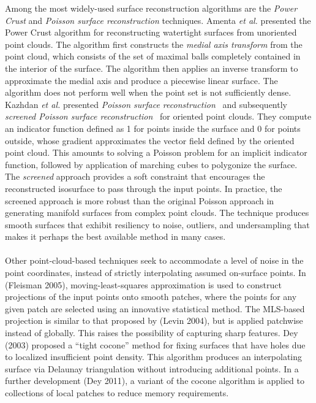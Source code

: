 Among the most widely-used surface reconstruction algorithms are the \textit{Power Crust} and \textit{Poisson surface reconstruction} techniques. Amenta \textit{et al.} \cite{amenta_2001} presented the Power Crust algorithm for reconstructing watertight surfaces from unoriented point clouds. The algorithm first constructs the \textit{medial axis transform} from the point cloud, which consists of the set of maximal balls completely contained in the interior of the surface. The algorithm then applies an inverse transform to approximate the medial axis and produce a piecewise linear surface. The algorithm does not perform well when the point set is not sufficiently dense. Kazhdan \textit{et al.} presented \textit{Poisson surface reconstruction}~\cite{kazhdan_2008} and subsequently \textit{screened Poisson surface reconstruction}~\cite{kazhdan_2013} for oriented point clouds. They compute an indicator function defined as 1 for points inside the surface and 0 for points outside, whose gradient approximates the vector field defined by the oriented point cloud. This amounts to solving a Poisson problem for an implicit indicator function, followed by application of marching cubes to polygonize the surface. The \textit{screened} approach provides a soft constraint that encourages the reconstructed isosurface to pass through the input points. In practice, the screened approach is more robust than the original Poisson approach in generating manifold surfaces from complex point clouds. The technique produces smooth surfaces that exhibit resiliency to noise, outliers, and undersampling that makes it perhaps the best available method in many cases. \\ \\


Other point-cloud-based techniques seek to accommodate a level of noise in the point coordinates, instead of strictly interpolating assumed on-surface points.  In (Fleisman 2005), moving-least-squares approximation is used to construct projections of the input points onto smooth patches, where the points for any given patch are selected using an innovative statistical method.  The MLS-based projection is similar to that proposed by (Levin 2004), but is applied patchwise instead of globally.  This raises the possibility of capturing sharp features. Dey (2003) proposed a ``tight cocone'' method for fixing surfaces that have holes due to localized insufficient point density.  This algorithm produces an interpolating surface via Delaunay triangulation without introducing additional points.  In a further development (Dey 2011), a variant of the cocone algorithm is applied to collections of local patches to reduce memory requirements.  

